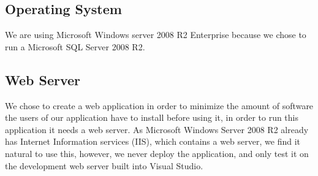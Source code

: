\subsection{Operating System}
\label{subsec:operating_system}
We are using Microsoft Windows server 2008 R2 Enterprise because we chose to run a Microsoft SQL Server 2008 R2. 

\subsection{Web Server}
\label{subsec:webserver}


We chose to create a web application in order to minimize the amount of software the users of our application have to install before using it, in order to run this application it needs a web server. As Microsoft Windows Server 2008 R2 already has Internet Information services (IIS), which contains a web server, we find it natural to use this, however, we never deploy the application, and only test it on the development web server built into Visual Studio.



